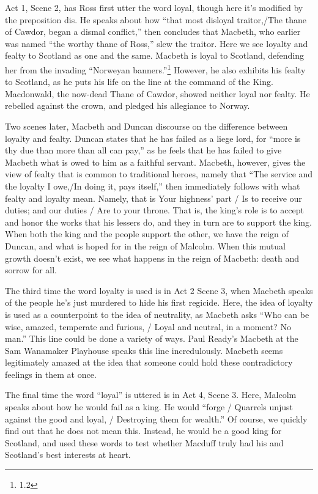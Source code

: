 \documentclass[12pt]{article}[titlepage]
\newcommand{\say}[1]{``#1''}
\newcommand{\1}{\={a}}
\newcommand{\2}{\={e}}
\newcommand{\3}{\={\i}}
\newcommand{\4}{\=o}
\newcommand{\5}{\=u}
\newcommand{\6}{\={A}}
\renewcommand{\,}{\textsuperscript{,}}
\begin{document}
Act 1, Scene 2, has Ross first utter the word loyal, though here it's modified by the preposition dis.
He speaks about how \say{that most disloyal traitor,/The thane of Cawdor, began a dismal conflict,} then concludes that Macbeth, who earlier was named \say{the worthy thane of Ross,} slew the traitor.
Here we see loyalty and fealty to Scotland as one and the same.
Macbeth is loyal to Scotland, defending her from the invading \say{Norweyan banners.}\footnote{1.2}
However, he also exhibits his fealty to Scotland, as he puts his life on the line at the command of the King.
Macdonwald, the now-dead Thane of Cawdor, showed neither loyal nor fealty.
He rebelled against the crown, and pledged his allegiance to Norway.

Two scenes later, Macbeth and Duncan discourse on the difference between loyalty and fealty.
Duncan states that he has failed as a liege lord, for \say{more is thy due than more than all can pay,} as he feels that he has failed to give Macbeth what is owed to him as a faithful servant.
Macbeth, however, gives the view of fealty that is common to traditional heroes, namely that \say{The service and the loyalty I owe,/In doing it, pays itself,} then immediately follows with what fealty and loyalty mean.
Namely, that is {Your highness' part / Is to receive our duties; and our duties / Are to your throne.}
That is, the king's role is to accept and honor the works that his lessers do, and they in turn are to support the king.
When both the king and the people support the other, we have the reign of Duncan, and what is hoped for in the reign of Malcolm.
When this mutual growth doesn't exist, we see what happens in the reign of Macbeth: death and sorrow for all.

The third time the word loyalty is used is in Act 2 Scene 3, when Macbeth speaks of the people he's just murdered to hide his first regicide.
Here, the idea of loyalty is used as a counterpoint to the idea of neutrality, as Macbeth asks \say{Who can be wise, amazed, temperate and furious, / Loyal and neutral, in a moment? No man.}
This line could be done a variety of ways.
Paul Ready's Macbeth at the Sam Wanamaker Playhouse speaks this line incredulously.
Macbeth seems legitimately amazed at the idea that someone could hold these contradictory feelings in them at once.

The final time the word \say{loyal} is uttered is in Act 4, Scene 3.
Here, Malcolm speaks about how he would fail as a king.
He would \say{forge / Quarrels unjust against the good and loyal, / Destroying them for wealth.}
Of course, we quickly find out that he does not mean this.
Instead, he would be a good king for Scotland, and used these words to test whether Macduff truly had his and Scotland's best interests at heart.
\end{document}
